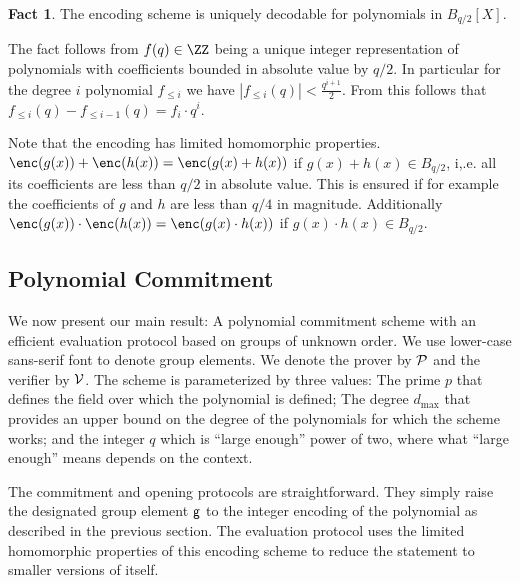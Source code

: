 \documentclass{article}
\theoremstyle{definition}
\newtheorem{fact}{Fact}
\begin{document}
\begin{fact}
	The encoding scheme is uniquely decodable for polynomials in $B_{q/2}[X]$.
\end{fact}
The fact follows from $f(q)\in \ZZ$ being a unique integer representation of polynomials with coefficients bounded in absolute value by $q/2$. In particular for the degree $i$ polynomial $f_{\leq i}$ we have $|f_{\leq i}(q)|<\frac{q^{i+1}}{2}$. From this follows that $f_{\leq i}(q)-f_{\leq i-1}(q)=f_i \cdot q^i$.  

Note that the encoding has limited homomorphic properties. $\enc(g(x))+\enc(h(x))=\enc(g(x)+h(x))$ if $g(x)+h(x)\in B_{q/2}$, i,.e. all its coefficients are less than $q/2$ in absolute value. This is ensured if for example the coefficients of $g$ and $h$ are less than $q/4$ in magnitude. Additionally $\enc(g(x))\cdot \enc(h(x))=\enc(g(x)\cdot h(x))$ if $g(x)\cdot h(x)\in B_{q/2}$.

\subsection{Polynomial Commitment}

We now present our main result: 
A polynomial commitment scheme with an efficient evaluation protocol based on groups of unknown order. We use lower-case \textsf{sans-serif} font to denote group elements. We denote the prover by $\mathcal{P}$ and the verifier by $\mathcal{V}$. The scheme is parameterized by three values: The prime $p$ that defines the field over which the polynomial is defined; The degree $d_{\max}$ that provides an upper bound on the degree of the polynomials for which the scheme works; and the integer $q$ which is ``large enough'' power of two, where what ``large enough'' means depends on the context.

The commitment and opening protocols are straightforward. They simply raise the designated group element $\mathsf{g}$ to the integer encoding of the polynomial as described in the previous section. The evaluation protocol uses the limited homomorphic properties of this encoding scheme to reduce the statement to smaller versions of itself.
\end{document}
